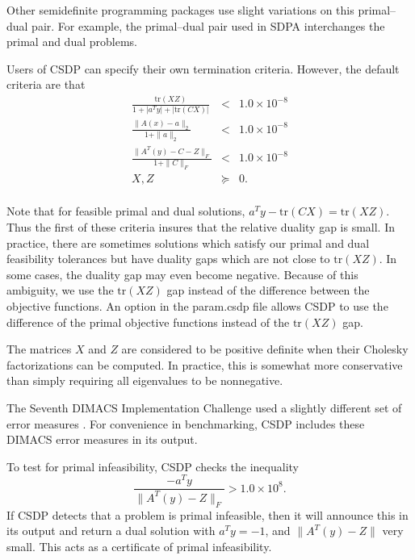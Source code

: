 \documentclass{article}
\begin{document}
Other semidefinite programming packages use slight variations on this
primal--dual pair.  For example, the primal--dual pair used in SDPA 
interchanges the primal and dual problems.

Users of CSDP can specify their own termination criteria.  However, the
default criteria are that 
\begin{equation}
\begin{array}{rcl}
   \frac{\mbox{tr}(XZ)}{1+ | a^{T}y| + | \mbox{tr}(CX)|} &  <  & 1.0 \times 10^{-8} \\ 
   \frac{\| A(x)- a\|_{2}}{1 + \| a \|_{2}} & < &  1.0 \times 10^{-8} \\ 
   \frac{\| A^{T}(y) -C -Z \|_{F}}{1 + \|C\|_{F}} & < & 1.0 \times 10^{-8} \\
   X,Z & \succeq & 0. \\
\end{array}
\end{equation}

Note that for feasible primal and dual solutions,
$a^Ty-\mbox{tr}(CX)=\mbox{tr}(XZ)$.  Thus the first of these criteria insures
that the relative duality gap is small.  In practice, there are
sometimes solutions which satisfy our primal and dual feasibility
tolerances but have duality gaps which are not close to
$\mbox{tr}(XZ)$.  In some cases, the duality gap may even become
negative.  Because of this ambiguity, we use the $\mbox{tr}(XZ)$ gap
instead of the difference between the objective functions.  An option
in the param.csdp file allows CSDP to use the difference of the primal
objective functions instead of the $\mbox{tr}(XZ)$ gap.

The matrices $X$ and $Z$ are considered to be positive definite when
their Cholesky factorizations can be computed.  In practice, this is
somewhat more conservative than simply requiring all eigenvalues to be
nonnegative.

The Seventh DIMACS Implementation Challenge used a slightly different
set of error measures \cite{MittelmannHD:AnibS}.  For convenience in
benchmarking, CSDP includes these DIMACS error measures in its
output.  

To test for primal infeasibility, CSDP checks the inequality
\begin{equation}
\frac{-a^{T}y}{\| A^{T}(y)-Z \|_{F}} > 1.0 \times 10^8.
\end{equation}
If CSDP detects that a problem is primal infeasible, then it will announce
this in its output and return a dual solution with $a^{T}y=-1$, and 
$\| A^{T}(y)-Z \|$ very small.  This acts as a certificate of primal 
infeasibility.  
\end{document}
